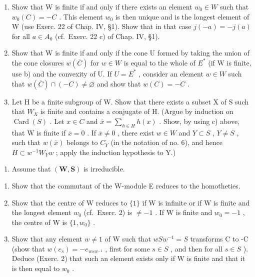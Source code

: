 \begin{enumerate}
\def\labelenumi{\alph{enumi})}
\setcounter{enumi}{1}
\item
  Show that W is finite if and only if there exists an element \(w_{0} \in W\) such that \(w_{0}(C) = -C\) . This element \(w_{0}\) is then unique and is the longest element of W (use Exerc. 22 of Chap. IV, §1). Show that in that case \(j(-a) = -j(a)\) for all \(a \in A_{0}\) (cf.~Exerc. 22 c) of Chap. IV, §1).
\item
  Show that W is finite if and only if the cone U formed by taking the union of the cone closures \(w(\overline{C})\) for \(w \in W\) is equal to the whole of \(E^{*}\) (if W is finite, use b) and the convexity of U. If \(U = E^{*}\) , consider an element \(w \in W\) such that \(w(\overline{C}) \cap (-C) \neq \varnothing\) and show that \(w(C) = -C\) .
\item
  Let H be a finite subgroup of W. Show that there exists a subset X of S such that \(W_{X}\) is finite and contains a conjugate of H. (Argue by induction on \(\operatorname{Card}(S)\) . Let \(x \in C\) and \(\overline{x} = \sum_{h \in H} h(x)\) . Show, by using c) above, that W is finite if \(\overline{x} = 0\) . If \(\overline{x} \neq 0\) , there exist \(w \in W\) and \(Y \subset S\) , \(Y \neq S\) , such that \(w(\overline{x})\) belongs to \(C_{Y}\) (in the notation of no. 6), and hence \(H \subset w^{-1}W_{Y}w\) ; apply the induction hypothesis to Y.)
\end{enumerate}

\begin{enumerate}
\def\labelenumi{\arabic{enumi})}
\setcounter{enumi}{2}
\tightlist
\item
  Assume that \((\mathbf{W},\mathbf{S})\) is irreducible.
\end{enumerate}

\begin{enumerate}
\def\labelenumi{\alph{enumi})}
\item
  Show that the commutant of the W-module E reduces to the homotheties.
\item
  Show that the centre of W reduces to \(\{1\}\) if W is infinite or if W is finite and the longest element \(w_{0}\) (cf.~Exerc. 2) is \(\neq -1\) . If W is finite and \(w_{0} = -1\) , the centre of W is \(\{1, w_{0}\}\) .
\item
  Show that any element \(w \neq 1\) of W such that \(wSw^{-1} = S\) transforms C to -C (show that \(w(e_s) = -e_{wsw^{-1}}\) , first for some \(s \in S\) , and then for all \(s \in S\) ). Deduce (Exerc. 2) that such an element exists only if W is finite and that it is then equal to \(w_0\) .
\end{enumerate}

